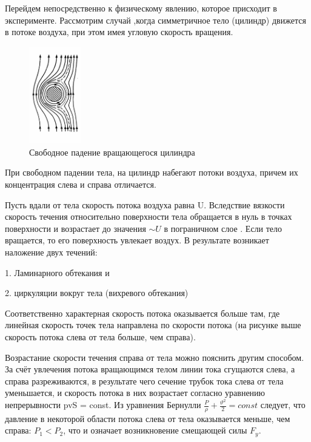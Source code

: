 \documentclass[a4paper]{article}
\begin{document}
Перейдем непосредственно к физическому явлению, которое присходит в эксперименте. 
Рассмотрим случай ,когда симметричное тело (цилиндр) движется в потоке воздуха, при этом имея угловую скорость вращения.


\begin{figure}[h]
\begin{center}
\includegraphics[width=0.20\textwidth]{pick2.PNG}
\caption{Свободное падение вращающегося цилиндра}
\end{center}
\end{figure}


\newpage

При свободном падении тела, на цилиндр набегают потоки воздуха, причем их концентрация слева и справа отличается.\par

Пусть вдали от тела скорость потока воздуха равна U. Вследствие 
вязкости скорость течения относительно поверхности тела обращается в 
нуль в точках поверхности и возрастает до значения $\sim U$ в пограничном 
слое . Если тело вращается, то его поверхность увлекает воздух. В результате возникает наложение двух течений:\par

1. Ламинарного обтекания и\par
2. циркуляции вокруг тела (вихревого обтекания)\par

Соответственно характерная скорость потока оказывается больше там, где 
линейная скорость точек тела направлена по скорости потока (на 
рисунке выше скорость потока слева от тела больше, чем справа).\par

Возрастание скорости течения справа от тела можно пояснить другим 
способом. За счёт увлечения потока вращающимся телом линии тока 
сгущаются слева, а справа разреживаются, в результате чего сечение трубок тока слева от тела уменьшается, и скорость потока в них возрастает 
согласно уравнению непрерывности pvS = const. Из уравнения Бернулли
$\frac{P}{\rho } + \frac{\vartheta^2}{2} = const  $ следует, что давление в некоторой области потока 
слева от тела оказывается меньше, чем справа: $P_{1}<P_{2}$, что и означает 
возникновение смещающей силы $F_{y}$.\par
\end{document}

